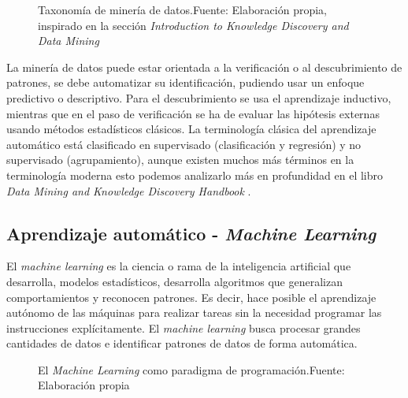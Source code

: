 \begin{figure}[H]
    \centering
    \centerline{}
    \caption{Taxonomía de minería de datos.\newline{}Fuente: Elaboración propia, inspirado en la sección \textit{Introduction to Knowledge Discovery and Data Mining} \cite{maimon2005data}}
    \label{fig:data-mining-taxonomy}
\end{figure}

La minería de datos puede estar orientada a la verificación o al descubrimiento de patrones, se debe automatizar su identificación, pudiendo usar un enfoque predictivo o descriptivo. Para el descubrimiento se usa el aprendizaje inductivo, mientras que en el paso de verificación se ha de evaluar las hipótesis externas usando métodos estadísticos clásicos. La terminología clásica del aprendizaje automático está clasificado en supervisado (clasificación y regresión) y no supervisado (agrupamiento), aunque existen muchos más términos en la terminología moderna esto podemos analizarlo más en profundidad en el libro \textit{Data Mining and Knowledge Discovery Handbook} \cite{maimon2005data}.


\subsection{Aprendizaje automático - \textit{Machine Learning}}

El \textit{machine learning} es la ciencia o rama de la inteligencia artificial que desarrolla, modelos estadísticos, desarrolla algoritmos que generalizan comportamientos y reconocen patrones. Es decir, hace posible el aprendizaje autónomo de las máquinas para realizar tareas sin la necesidad programar las instrucciones explícitamente. El \textit{machine learning} busca procesar grandes cantidades de datos e identificar patrones de datos de forma automática.

\begin{figure}[H]
    \centering
    \centerline{}
    \caption{El \textit{Machine Learning} como paradigma de programación.\newline{}Fuente: Elaboración propia}
    \label{fig:machine-learning-rules}
\end{figure}

